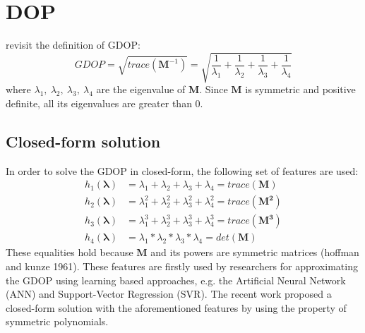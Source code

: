 \documentclass[a4paper]{report}
\begin{document}
\section{DOP}
revisit the definition of GDOP:
\begin{equation}
GDOP = \sqrt{trace(\mathbf{M}^{-1})}=\sqrt{\frac{1}{\lambda_1}+\frac{1}{\lambda_2}+\frac{1}{\lambda_3}+\frac{1}{\lambda_4}}
\label{eq_raw_dop1}
\end{equation}
where $\lambda_1,\ \lambda_2,\ \lambda_3,\ \lambda_4$ are the eigenvalue of $\mathbf{M}$. Since $\mathbf{M}$ is symmetric and positive definite, all its eigenvalues are greater than $0$. 

\subsection{Closed-form solution}
In order to solve the GDOP in closed-form, the following set of features are used:
\begin{align}
h_1(\mathbf{\lambda})&=\lambda_1+\lambda_2+\lambda_3+\lambda_4=trace(\mathbf{M}) \\
h_2(\mathbf{\lambda})&=\lambda_1^2+\lambda_2^2+\lambda_3^2+\lambda_4^2=trace(\mathbf{M^2}) \\
h_3(\mathbf{\lambda})&=\lambda_1^3+\lambda_2^3+\lambda_3^3+\lambda_4^3=trace(\mathbf{M^3}) \\
h_4(\mathbf{\lambda})&=\lambda_1*\lambda_2*\lambda_3*\lambda_4=det(\mathbf{M})
\end{align}
These equalities hold because $\mathbf{M}$ and its powers are symmetric matrices (hoffman and kunze 1961). These features are firstly used by researchers for approximating the GDOP using learning based approaches, e.g. the Artificial Neural Network (ANN) and Support-Vector Regression (SVR). The recent work proposed a closed-form solution with the aforementioned features by using the property of symmetric polynomials.
\end{document}
